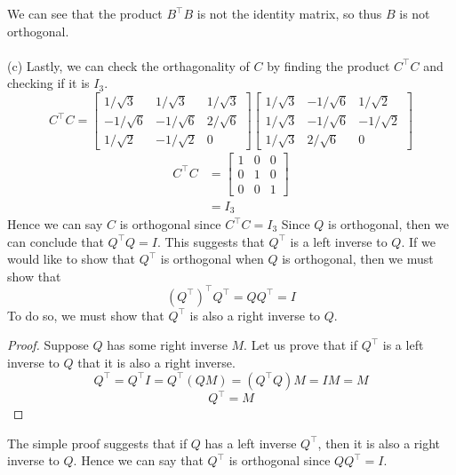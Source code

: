 \documentclass{report}
\begin{document}
We can see that the product $B^\top B$ is not the identity matrix, so thus $B$ is not orthogonal.\\
\\
\noindent(c) Lastly, we can check the orthagonality of $C$ by finding the product $C^\top C$ and checking if it is $I_3$.
$$
C^\top C = \begin{bmatrix}
1/\sqrt{3}&1/\sqrt{3}&1/\sqrt{3}\\
-1/\sqrt{6}&-1/\sqrt{6}&2/\sqrt{6}\\
1/\sqrt{2}&-1/\sqrt{2}&0
\end{bmatrix}
\begin{bmatrix}
1 / \sqrt{3} & -1 / \sqrt{6} & 1 / \sqrt{2} \\
1 / \sqrt{3} & -1 / \sqrt{6} & -1 / \sqrt{2} \\
1 / \sqrt{3} & 2 / \sqrt{6} & 0
\end{bmatrix}
$$
$$
\begin{aligned}
C^\top C &= \begin{bmatrix}
1&0&0\\
0&1&0\\
0&0&1
\end{bmatrix}\\
&= I_3
\end{aligned}
$$
Hence we can say $C$ is orthogonal since $C^\top C = I_3$
\sol Since $Q$ is orthogonal,  then we can conclude that $Q^\top Q = I$. This suggests that $Q^\top$ is a left inverse to $Q$.  If we would like to show that $Q^\top$ is orthogonal when $Q$ is orthogonal,  then we must show that
$$
(Q^\top)^\top Q^\top = QQ^\top = I
$$
To do so,  we must show that $Q^\top$ is also a right inverse to $Q$.
\begin{proof}
Suppose $Q$ has some right inverse $M$.  Let us prove that if $Q^\top$ is a left inverse to $Q$ that it is also a right inverse. 
$$
Q^\top = Q^\top I = Q^\top(QM) = (Q^\top Q)M = IM = M
$$
$$
Q^\top = M
$$
\end{proof}
\noindent The simple proof suggests that if $Q$ has a left inverse $Q^\top$, then it is also a right inverse to $Q$.  Hence we can say that $Q^\top$ is orthogonal since $QQ^\top = I$.
\end{document}
